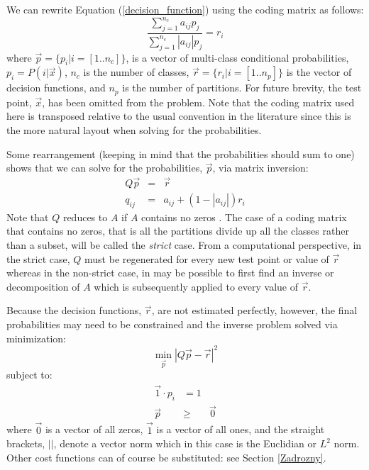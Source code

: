 We can rewrite Equation (\ref{decision_function}) using the coding 
matrix as follows:
\begin{equation}
	\frac{\sum_{j=1}^{n_c} a_{ij} p_j}{\sum_{j=1}^{n_c} |a_{ij}| p_j} = r_i
	\label{non_hier}
\end{equation}
where $\vec p=\lbrace p_i | i=[1..n_c]\rbrace$, 
is a vector of multi-class conditional probabilities, $p_i=P(i|\vec x)$, 
$n_c$ is the number of classes,
$\vec r=\lbrace r_i| i=[1..n_p]\rbrace$ 
is the vector of decision functions,
and
$n_p$ is the number of partitions.
For future brevity, the test point, $\vec x$, has been omitted from the problem. 
Note that the coding matrix used here is transposed relative to the usual
convention in the literature since this is the more natural layout when 
solving for the probabilities.

Some rearrangement (keeping in mind that the probabilities should sum to one)
shows that we can solve for the probabilities, $\vec p$, via matrix inversion:
\begin{eqnarray}
	Q \vec p & = & \vec r \label{basic_system}\\
	q_{ij} & = & a_{ij} + (1-|a_{ij}|) r_i 
	\label{matrix_equation2}
\end{eqnarray}
Note that $Q$ reduces to $A$ if $A$ contains no zeros \citep{Kong_Dietterich1997}.
The case of a coding matrix that contains no zeros, that is all the partitions divide up all the
classes rather than a subset, will be called the {\it strict} case.
From a computational perspective,
in the strict case,
$Q$ must be regenerated for every new test point or value of $\vec r$ 
whereas in the non-strict case, in may be possible to first find an inverse or
decomposition of $A$ which is subsequently
applied to every value of $\vec r$.

Because the decision functions, $\vec r$, are not estimated perfectly, however,
the final probabilities may need to be constrained and the inverse
problem solved via minimization:
\begin{equation}
	\min_{\vec p} | Q \vec p - \vec r |^2 \label{minimization_problem}
\end{equation}
subject to:
\begin{eqnarray}
	\vec 1 \cdot p_i & = 1 \label{normalization}\\
	\vec p & \ge & \vec 0 \label{nonnegative}
\end{eqnarray}
where 
$\vec 0$ is a vector of all zeros,
$\vec 1$ is a vector of all ones,
and the straight brackets, $||$, denote a vector norm which  
in this case is the Euclidian or $L^2$ norm.
Other cost functions can of course be substituted: see Section \ref{Zadrozny}.


